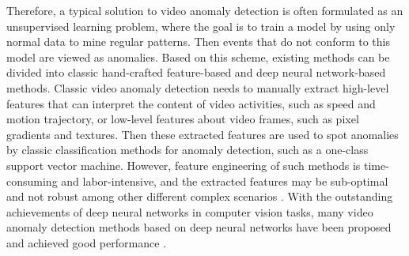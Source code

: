\documentclass[sigconf]{acmart}
\begin{document}
Therefore, a typical solution to video anomaly detection is often formulated as an unsupervised learning problem, where the goal is to train a model by using only normal data to mine regular patterns. Then events that do not conform to this model are viewed as anomalies. Based on this scheme, existing methods can be divided into classic hand-crafted feature-based and deep neural network-based methods. Classic video anomaly detection \cite{adam2008robust, benezeth2009abnormal, kim2009observe} needs to manually extract high-level features that can interpret the content of video activities, such as speed and motion trajectory, or low-level features about video frames, such as pixel gradients and textures. Then these extracted features are used to spot anomalies by classic classification methods for anomaly detection, such as a one-class support vector machine. However, feature engineering of such methods is time-consuming and labor-intensive, and the extracted features may be sub-optimal and not robust among other different complex scenarios \cite{xu2017detecting}. With the outstanding achievements of deep neural networks in computer vision tasks, many video anomaly detection methods based on deep neural networks have been proposed and achieved good performance \cite{lu2013abnormal, luo2017revisit, liu2018future, hasan2016learning, lu2019future, luo2017remembering, nguyen2019anomaly, cai2021appearance, liu2021hybrid}.
  
\end{document}
